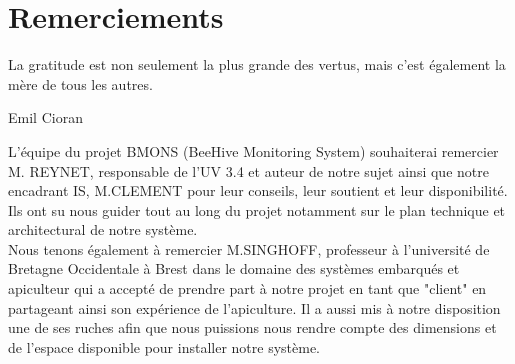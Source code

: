 
\chapter{Remerciements}
\epigraph{La gratitude est non seulement la plus grande des vertus, mais c'est également la mère de tous les autres.}{Emil Cioran}

L'équipe du projet BMONS (BeeHive Monitoring System) souhaiterai remercier M. REYNET, responsable de l'UV 3.4 et auteur de notre sujet ainsi que notre encadrant IS, M.CLEMENT pour leur conseils, leur soutient et leur disponibilité. Ils ont su nous guider tout au long du projet notamment sur le plan technique et architectural de notre système. \\

Nous tenons également à remercier M.SINGHOFF, professeur à l'université de Bretagne Occidentale à Brest dans le domaine des systèmes embarqués et apiculteur qui a accepté de prendre part à notre projet en tant que "client" en partageant ainsi son expérience de l'apiculture. Il a aussi mis à notre disposition une de ses ruches afin que nous puissions nous rendre compte des dimensions et de l'espace disponible pour installer notre système.
       
 
